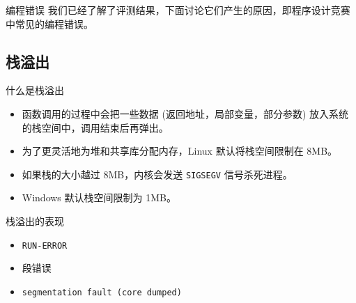 \documentclass[10pt,mathserif]{beamer}
\begin{document}
\begin{frame}{编程错误}
	我们已经了解了评测结果，下面讨论它们产生的原因，即程序设计竞赛中常见的编程错误。
\end{frame}

\subsection{栈溢出}

\begin{frame}{什么是栈溢出}
	\begin{itemize}
		\item 函数调用的过程中会把一些数据 (返回地址，局部变量，部分参数)
			放入系统的栈空间中，调用结束后再弹出。
		\item 为了更灵活地为堆和共享库分配内存，Linux 默认将栈空间限制在 8MB。
		\item 如果栈的大小越过 8MB，内核会发送 \lstinline!SIGSEGV!
			信号杀死进程。
		\item Windows 默认栈空间限制为 1MB。
	\end{itemize}
\end{frame}

\begin{frame}{栈溢出的表现}
	\begin{itemize}
		\item \lstinline{RUN-ERROR}
		\item 段错误
		\item \lstinline{segmentation fault (core dumped)}
	\end{itemize}
\end{frame}
\end{document}
